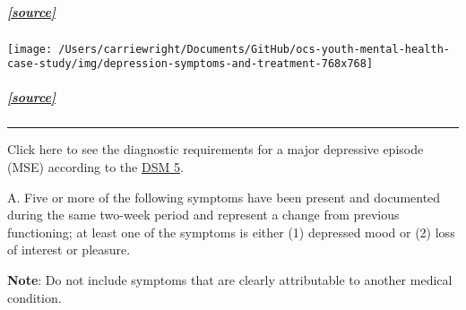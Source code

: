 \documentclass[
]{article}
\begin{document}
\hypertarget{source}{%
\subparagraph{\texorpdfstring{\href{https://www.icsi.org/guideline/depression/diagnose-and-characterize-major-depression-persistent-depressive-disorder-with-clinical-interview/}{{[}source{]}}}{{[}source{]}}}\label{source}}

\begin{center}\texttt{[image: /Users/carriewright/Documents/GitHub/ocs-youth-mental-health-case-study/img/depression-symptoms-and-treatment-768x768]} \end{center}

\hypertarget{source-1}{%
\subparagraph{\texorpdfstring{\href{https://newmilfordcounselingcenter.com/depression-2/}{{[}source{]}}}{{[}source{]}}}\label{source-1}}

\begin{center}\rule{0.5\linewidth}{0.5pt}\end{center}

Click here to see the diagnostic requirements for a major depressive
episode (MSE) according to the
\href{https://en.wikipedia.org/wiki/DSM-5}{DSM 5}.

A. Five or more of the following symptoms have been present and
documented during the same two-week period and represent a change from
previous functioning; at least one of the symptoms is either (1)
depressed mood or (2) loss of interest or pleasure.

\textbf{Note}: Do not include symptoms that are clearly attributable to
another medical condition.
\end{document}
